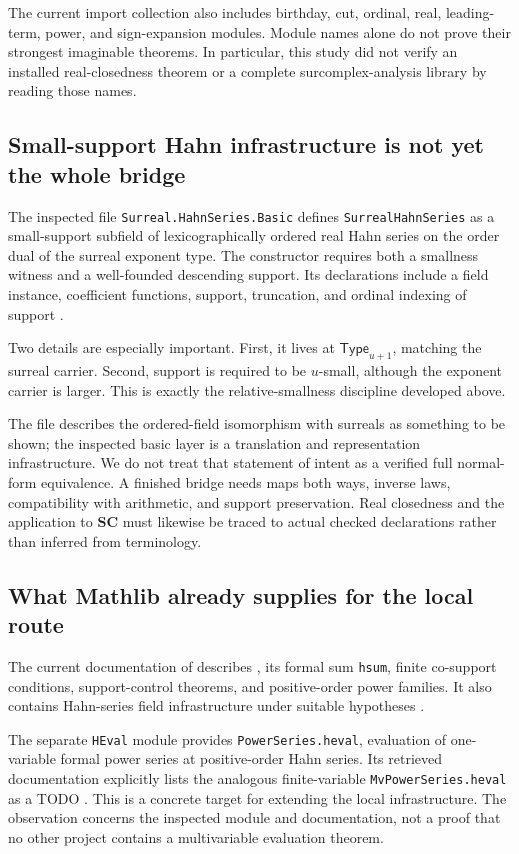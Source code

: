 \documentclass[11pt,letterpaper]{article}
\theoremstyle{definition}
\theoremstyle{remark}
\newcommand{\SC}{\mathbf{SC}}
\newcommand{\Type}{\mathsf{Type}}
\numberwithin{equation}{section}
\begin{document}
The current import collection also includes birthday, cut, ordinal, real, leading-term, power, and sign-expansion modules. Module names alone do not prove their strongest imaginable theorems. In particular, this study did not verify an installed real-closedness theorem or a complete surcomplex-analysis library by reading those names.

\subsection{Small-support Hahn infrastructure is not yet the whole bridge}
The inspected file \texttt{Surreal.HahnSeries.Basic} defines \texttt{SurrealHahnSeries} as a small-support subfield of lexicographically ordered real Hahn series on the order dual of the surreal exponent type. The constructor requires both a smallness witness and a well-founded descending support. Its declarations include a field instance, coefficient functions, support, truncation, and ordinal indexing of support \cite{GamesHahn}.

Two details are especially important. First, it lives at \(\Type_{u+1}\), matching the surreal carrier. Second, support is required to be \(u\)-small, although the exponent carrier is larger. This is exactly the relative-smallness discipline developed above.

The file describes the ordered-field isomorphism with surreals as something to be shown; the inspected basic layer is a translation and representation infrastructure. We do not treat that statement of intent as a verified full normal-form equivalence. A finished bridge needs maps both ways, inverse laws, compatibility with arithmetic, and support preservation. Real closedness and the application to \(\SC\) must likewise be traced to actual checked declarations rather than inferred from terminology.

\subsection{What Mathlib already supplies for the local route}
The current documentation of  describes , its formal sum \texttt{hsum}, finite co-support conditions, support-control theorems, and positive-order power families. It also contains Hahn-series field infrastructure under suitable hypotheses \cite{MathlibSummable}.

The separate \texttt{HEval} module provides \texttt{PowerSeries.heval}, evaluation of one-variable formal power series at positive-order Hahn series. Its retrieved documentation explicitly lists the analogous finite-variable \texttt{MvPowerSeries.heval} as a TODO \cite{MathlibHEval}. This is a concrete target for extending the local infrastructure. The observation concerns the inspected module and documentation, not a proof that no other project contains a multivariable evaluation theorem.
\end{document}
